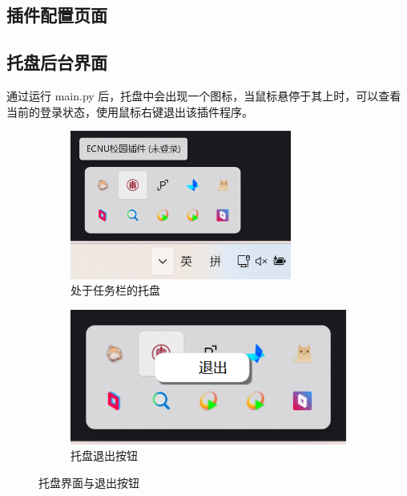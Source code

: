 \documentclass[14pt,a4paper,UTF8,twoside]{article}
\begin{document}
\subsection{插件配置页面}

\subsection{托盘后台界面}

通过运行 main.py 后，托盘中会出现一个图标，当鼠标悬停于其上时，可以查看当前的登录状态，使用鼠标右键退出该插件程序。

\begin{figure}[H]
    \centering
    \begin{subfigure}[b]{0.35\textwidth}
        \centering
        \includegraphics[width=0.8\textwidth]{img/tray_interface.png}
        \caption{处于任务栏的托盘}
        \label{fig:tray_interface}
    \end{subfigure}
    \hspace{0.06\textwidth}
    \begin{subfigure}[b]{0.3\textwidth}
        \centering
        \includegraphics[width=\textwidth]{img/tray_exit.png}
        \caption{托盘退出按钮}
        \label{fig:tray_exit}
    \end{subfigure}
    \caption{托盘界面与退出按钮}
    \label{fig:tray_combined}
\end{figure}
\end{document}
